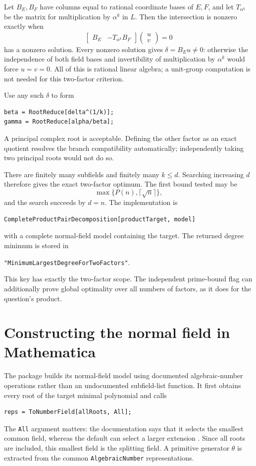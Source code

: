 \documentclass[11pt,a4paper]{article}
\theoremstyle{definition}\newtheorem{definition}[theorem]{Definition}
\theoremstyle{remark}\newtheorem{remark}[theorem]{Remark}
\newcommand{\code}[1]{\texttt{#1}}
\begin{document}
Let $B_E,B_F$ have columns equal to rational coordinate bases of $E,F$, and let $T_{\alpha^k}$ be the matrix for multiplication by $\alpha^k$ in $L$. Then the intersection is nonzero exactly when
\begin{equation}
\begin{bmatrix}B_E&-T_{\alpha^k}B_F\end{bmatrix}
\begin{pmatrix}u\\v\end{pmatrix}=0
\label{eq:binarynullspace}
\end{equation}
has a nonzero solution. Every nonzero solution gives $\delta=B_Eu\neq0$: otherwise the independence of both field bases and invertibility of multiplication by $\alpha^k$ would force $u=v=0$. All of this is rational linear algebra; a unit-group computation is not needed for this two-factor criterion.

Use any such $\delta$ to form
\begin{lstlisting}
beta = RootReduce[delta^(1/k)];
gamma = RootReduce[alpha/beta];
\end{lstlisting}
A principal complex root is acceptable. Defining the other factor as an exact quotient resolves the branch compatibility automatically; independently taking two principal roots would not do so.

There are finitely many subfields and finitely many $k\leq d$. Searching increasing $d$ therefore gives the exact two-factor optimum. The first bound tested may be
\[
\max\{P(n),\lceil\sqrt n\rceil\},
\]
and the search succeeds by $d=n$. The implementation is
\begin{lstlisting}
CompleteProductPairDecomposition[productTarget, model]
\end{lstlisting}
with a complete normal-field model containing the target. The returned degree minimum is stored in\par
\code{"MinimumLargestDegreeForTwoFactors"}.\par
This key has exactly the two-factor scope. The independent prime-bound flag can additionally prove global optimality over all numbers of factors, as it does for the question's product.

\section{Constructing the normal field in Mathematica}
\label{sec:model}
The package builds its normal-field model using documented algebraic-number operations rather than an undocumented subfield-list function. It first obtains every root of the target minimal polynomial and calls
\begin{lstlisting}
reps = ToNumberField[allRoots, All];
\end{lstlisting}
The \code{All} argument matters: the documentation says that it selects the smallest common field, whereas the default can select a larger extension \cite{tonumberfield}. Since all roots are included, this smallest field is the splitting field. A primitive generator $\theta$ is extracted from the common \code{AlgebraicNumber} representations.
\end{document}
